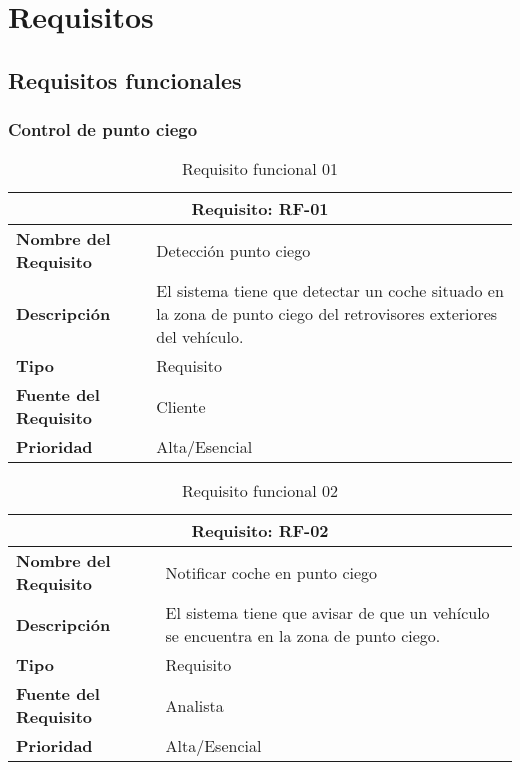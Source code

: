 \documentclass[10pt,a4paper,oldfontcommands]{dpds}
\begin{document}
\pagecolor{fondo}
\color{principal}


\section{Requisitos}
\subsection{Requisitos funcionales}


\subsubsection{Control de punto ciego}

\begin{table}[H]
\begin{center}
\begin{tabular}{p{} p{7cm}}
\multicolumn{2}{c}{\textbf{Requisito: RF-01} } \\
\hline \hline
\textbf{Nombre del Requisito} & Detección punto ciego  \\
\textbf{Descripción} & El sistema tiene que detectar un coche situado en la zona de punto ciego del retrovisores exteriores del vehículo.  \\
\textbf{Tipo} & Requisito  \\
\textbf{Fuente del Requisito} & Cliente  \\
\textbf{Prioridad} & Alta/Esencial  \\ \hline
\end{tabular}
\caption{Requisito funcional 01}
\label{tab:personal}
\end{center}
\end{table}

\begin{table}[H]
\begin{center}
\begin{tabular}{p{} p{7cm}}
\multicolumn{2}{c}{\textbf{Requisito: RF-02} } \\
\hline \hline
\textbf{Nombre del Requisito} & Notificar coche en punto ciego  \\
\hline
\textbf{Descripción} & El sistema tiene que avisar de que un vehículo se encuentra en la zona de punto ciego. \\
\hline
\textbf{Tipo} & Requisito  \\
\hline
\textbf{Fuente del Requisito} & Analista  \\
\hline
\textbf{Prioridad} & Alta/Esencial  \\ \hline
\end{tabular}
\caption{Requisito funcional 02}
\label{tab:personal}
\end{center}
\end{table}
\end{document}
